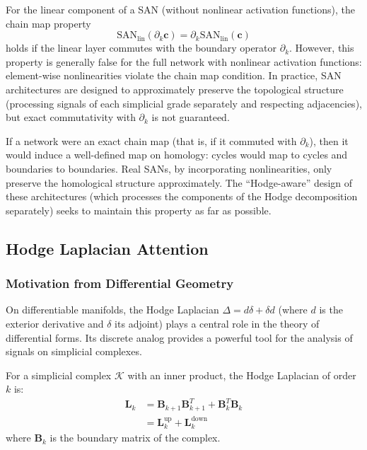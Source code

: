 \begin{remark}\label{rem:respeto_estructura_cadenas}
For the linear component of a SAN (without nonlinear activation functions), the chain map property
\begin{equation}
    \text{SAN}_{\text{lin}}(\partial_k \mathbf{c}) = \partial_k \text{SAN}_{\text{lin}}(\mathbf{c})
\end{equation}
holds if the linear layer commutes with the boundary operator $\partial_k$. However, this property is generally false for the full network with nonlinear activation functions: element-wise nonlinearities violate the chain map condition. In practice, SAN architectures are designed to approximately preserve the topological structure (processing signals of each simplicial grade separately and respecting adjacencies), but exact commutativity with $\partial_k$ is not guaranteed.
\end{remark}

\begin{remark}\label{cor:preservacion_homologia}
If a network were an exact chain map (that is, if it commuted with $\partial_k$), then it would induce a well-defined map on homology: cycles would map to cycles and boundaries to boundaries. Real SANs, by incorporating nonlinearities, only preserve the homological structure approximately. The ``Hodge-aware'' design of these architectures (which processes the components of the Hodge decomposition separately) seeks to maintain this property as far as possible.
\end{remark}

\subsection{Hodge Laplacian Attention}

\subsubsection{Motivation from Differential Geometry}

On differentiable manifolds, the Hodge Laplacian $\Delta = d \delta + \delta d$ (where $d$ is the exterior derivative and $\delta$ its adjoint) plays a central role in the theory of differential forms. Its discrete analog provides a powerful tool for the analysis of signals on simplicial complexes.

\begin{definition}\label{def:hodge_laplacian_discreto}
For a simplicial complex $\mathcal{K}$ with an inner product, the Hodge Laplacian of order $k$ is:
\begin{align}
    \mathbf{L}_k &= \mathbf{B}_{k+1} \mathbf{B}_{k+1}^T + \mathbf{B}_k^T \mathbf{B}_k \\
    &= \mathbf{L}_k^{\text{up}} + \mathbf{L}_k^{\text{down}}
\end{align}
where $\mathbf{B}_k$ is the boundary matrix of the complex.
\end{definition}

